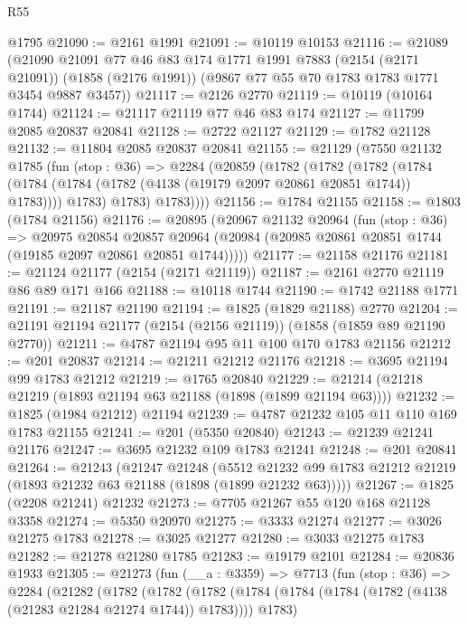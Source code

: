 \begin{lexlean}{R55}
\begin{coremodule}
    @1795
@21090 := @2161 @1991
@21091 := @10119 @10153
@21116 := @21089
    (@21090
      @21091
      @77
      @46
      @83
      @174
      @1771
      @1991
      @7883
      (@2154 (@2171 @21091))
      (@1858 (@2176 @1991))
      (@9867 @77 @55 @70 @1783 @1783 @1771 @3454 @9887 @3457))
@21117 := @2126 @2770
@21119 := @10119 (@10164 @1744)
@21124 := @21117 @21119 @77 @46 @83 @174
@21127 := @11799 @2085 @20837 @20841
@21128 := @2722 @21127
@21129 := @1782 @21128
@21132 := @11804 @2085 @20837 @20841
@21155 := @21129
    (@7550
      @21132
      @1785
      (fun (stop : @36) =>
      @2284
        (@20859
          (@1782
            (@1782
              (@1782
                (@1784 (@1784 (@1784 (@1782 (@4138 (@19179 @2097 @20861 @20851 @1744)) @1783))))
                @1783)
              @1783)
            @1783))))
@21156 := @1784 @21155
@21158 := @1803 (@1784 @21156)
@21176 := @20895
    (@20967
      @21132
      @20964
      (fun (stop : @36) =>
      @20975
        @20854
        @20857
        @20964
        (@20984 (@20985 @20861 @20851 @1744 (@19185 @2097 @20861 @20851 @1744)))))
@21177 := @21158 @21176
@21181 := @21124 @21177 (@2154 (@2171 @21119))
@21187 := @2161 @2770 @21119 @86 @89 @171 @166
@21188 := @10118 @1744
@21190 := @1742 @21188 @1771
@21191 := @21187 @21190
@21194 := @1825 (@1829 @21188) @2770
@21204 := @21191 @21194 @21177 (@2154 (@2156 @21119)) (@1858 (@1859 @89 @21190 @2770))
@21211 := @4787 @21194 @95 @11 @100 @170 @1783 @21156
@21212 := @201 @20837
@21214 := @21211 @21212 @21176
@21218 := @3695 @21194 @99 @1783 @21212
@21219 := @1765 @20840
@21229 := @21214 (@21218 @21219 (@1893 @21194 @63 @21188 (@1898 (@1899 @21194 @63))))
@21232 := @1825 (@1984 @21212) @21194
@21239 := @4787 @21232 @105 @11 @110 @169 @1783 @21155
@21241 := @201 (@5350 @20840)
@21243 := @21239 @21241 @21176
@21247 := @3695 @21232 @109 @1783 @21241
@21248 := @201 @20841
@21264 := @21243
    (@21247
      @21248
      (@5512 @21232 @99 @1783 @21212 @21219 (@1893 @21232 @63 @21188 (@1898 (@1899 @21232 @63)))))
@21267 := @1825 (@2208 @21241) @21232
@21273 := @7705 @21267 @55 @120 @168 @21128 @3358
@21274 := @5350 @20970
@21275 := @3333 @21274
@21277 := @3026 @21275 @1783
@21278 := @3025 @21277
@21280 := @3033 @21275 @1783
@21282 := @21278 @21280 @1785
@21283 := @19179 @2101
@21284 := @20836 @1933
@21305 := @21273
    (fun (__a : @3359) =>
    @7713
      (fun (stop : @36) =>
      @2284
        (@21282
          (@1782
            (@1782
              (@1782
                (@1784 (@1784 (@1784 (@1782 (@4138 (@21283 @21284 @21274 @1744)) @1783))))
                @1783)

\end{coremodule}
\end{lexlean}
